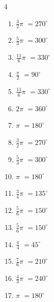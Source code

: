 \begin{multicols}{4}
\begin{enumerate}
  \item $\displaystyle \frac{3}{2}\pi$
        $\displaystyle =270^{\circ}$

  \item $\displaystyle \frac{5}{3}\pi$
        $\displaystyle =300^{\circ}$

  \item $\displaystyle \frac{11}{6}\pi$
        $\displaystyle =330^{\circ}$

  \item $\displaystyle \frac{\pi}{2}$
        $\displaystyle =90^{\circ}$

  \item $\displaystyle \frac{11}{6}\pi$
        $\displaystyle =330^{\circ}$

  \item $\displaystyle 2\pi$
        $\displaystyle =360^{\circ}$

  \item $\displaystyle \pi$
        $\displaystyle =180^{\circ}$

  \item $\displaystyle \frac{3}{2}\pi$
        $\displaystyle =270^{\circ}$

  \item $\displaystyle \frac{5}{3}\pi$
        $\displaystyle =300^{\circ}$

  \item $\displaystyle \pi$
        $\displaystyle =180^{\circ}$

  \item $\displaystyle \frac{3}{4}\pi$
        $\displaystyle =135^{\circ}$

  \item $\displaystyle \frac{5}{6}\pi$
        $\displaystyle =150^{\circ}$

  \item $\displaystyle \frac{5}{6}\pi$
        $\displaystyle =150^{\circ}$

  \item $\displaystyle \frac{\pi}{4}$
        $\displaystyle =45^{\circ}$

\columnbreak %

  \item $\displaystyle \frac{7}{6}\pi$
        $\displaystyle =210^{\circ}$

  \item $\displaystyle \frac{4}{3}\pi$
        $\displaystyle =240^{\circ}$

  \item $\displaystyle \pi$
        $\displaystyle =180^{\circ}$


\end{enumerate}
\end{multicols}
